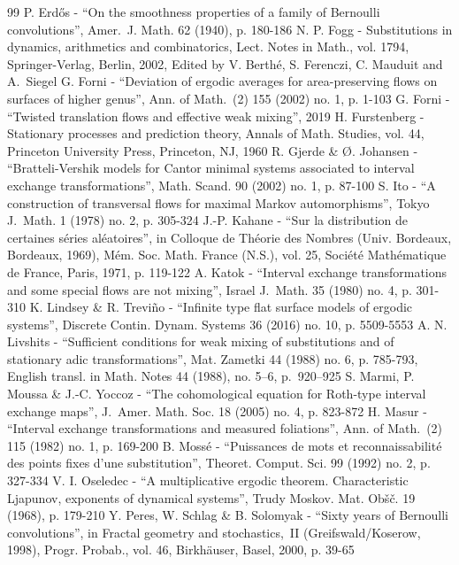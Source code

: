 \begin{thebibliography}{99}
 P. Erdős - “On the smoothness properties of a family of Bernoulli convolutions”, Amer. J. Math. 62 (1940), p. 180-186
 N. P. Fogg - Substitutions in dynamics, arithmetics and combinatorics, Lect. Notes in Math., vol. 1794, Springer-Verlag, Berlin, 2002, Edited by V. Berthé, S. Ferenczi, C. Mauduit and A. Siegel
 G. Forni - “Deviation of ergodic averages for area-preserving flows on surfaces of higher genus”, Ann. of Math. (2) 155 (2002) no. 1, p. 1-103
 G. Forni - “Twisted translation flows and effective weak mixing”, 2019
 H. Furstenberg - Stationary processes and prediction theory, Annals of Math. Studies, vol. 44, Princeton University Press, Princeton, NJ, 1960
 R. Gjerde \& Ø. Johansen - “Bratteli-Vershik models for Cantor minimal systems associated to interval exchange transformations”, Math. Scand. 90 (2002) no. 1, p. 87-100
 S. Ito - “A construction of transversal flows for maximal Markov automorphisms”, Tokyo J. Math. 1 (1978) no. 2, p. 305-324
 J.-P. Kahane - “Sur la distribution de certaines séries aléatoires”, in Colloque de Théorie des Nombres (Univ. Bordeaux, Bordeaux, 1969), Mém. Soc. Math. France (N.S.), vol. 25, Société Mathématique de France, Paris, 1971, p. 119-122
 A. Katok - “Interval exchange transformations and some special flows are not mixing”, Israel J. Math. 35 (1980) no. 4, p. 301-310
 K. Lindsey \& R. Treviño - “Infinite type flat surface models of ergodic systems”, Discrete Contin. Dynam. Systems 36 (2016) no. 10, p. 5509-5553
 A. N. Livshits - “Sufficient conditions for weak mixing of substitutions and of stationary adic transformations”, Mat. Zametki 44 (1988) no. 6, p. 785-793, English transl. in Math. Notes 44 (1988), no. 5–6, p. 920–925
 S. Marmi, P. Moussa \& J.-C. Yoccoz - “The cohomological equation for Roth-type interval exchange maps”, J. Amer. Math. Soc. 18 (2005) no. 4, p. 823-872
 H. Masur - “Interval exchange transformations and measured foliations”, Ann. of Math. (2) 115 (1982) no. 1, p. 169-200
 B. Mossé - “Puissances de mots et reconnaissabilité des points fixes d’une substitution”, Theoret. Comput. Sci. 99 (1992) no. 2, p. 327-334
 V. I. Oseledec - “A multiplicative ergodic theorem. Characteristic Ljapunov, exponents of dynamical systems”, Trudy Moskov. Mat. Obšč. 19 (1968), p. 179-210
 Y. Peres, W. Schlag \& B. Solomyak - “Sixty years of Bernoulli convolutions”, in Fractal geometry and stochastics, II (Greifswald/Koserow, 1998), Progr. Probab., vol. 46, Birkhäuser, Basel, 2000, p. 39-65

\end{thebibliography}
